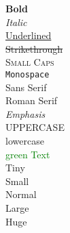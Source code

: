 \documentclass{article}
\begin{document}
\textbf{Bold} \\
\textit{Italic} \\
\underline{Underlined} \\
\sout{Strikethrough} \\
\textsc{Small Caps} \\
\texttt{Monospace} \\
\textsf{Sans Serif} \\
\textrm{Roman Serif} \\
\emph{Emphasis} \\
\MakeUppercase{uppercase} \\
\MakeLowercase{LOWERCASE} \\
\textcolor{green}{green Text} \\

{\tiny Tiny} \\
{\small Small} \\
{\normalsize Normal} \\
{\Large Large} \\
{\Huge Huge}
\end{document}

